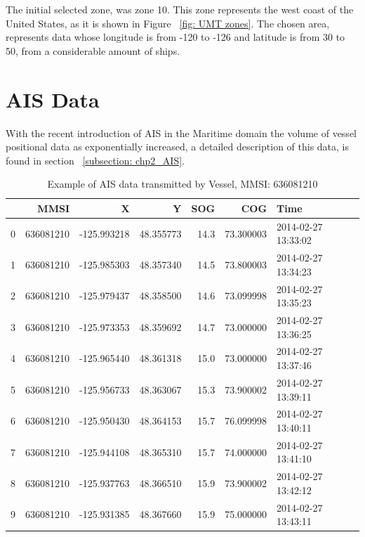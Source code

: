 The initial selected zone, was zone 10. This zone represents the west coast of the United States, as it is shown in Figure ~\ref{fig: UMT zones}.
The chosen area, represents data whose longitude is from -120 to -126 and latitude is from 30 to 50, from a considerable amount of ships.


\section{AIS Data}
\label{section: AIS Data}
 With the recent introduction of AIS in the Maritime domain the volume of vessel positional data as exponentially increased, a detailed description of this data, is found in section ~\ref{subsection: chp2_AIS}.

\begin{table}[H]
  \centering
{\small
\begin{tabular}{lrrrrrl}
\toprule
{} &       MMSI &           X &          Y &   SOG &        COG &                Time \\
\midrule
0 &  636081210 & -125.993218 &  48.355773 &  14.3 &  73.300003 & 2014-02-27 13:33:02 \\
1 &  636081210 & -125.985303 &  48.357340 &  14.5 &  73.800003 & 2014-02-27 13:34:23 \\
2 &  636081210 & -125.979437 &  48.358500 &  14.6 &  73.099998 & 2014-02-27 13:35:23 \\
3 &  636081210 & -125.973353 &  48.359692 &  14.7 &  73.000000 & 2014-02-27 13:36:25 \\
4 &  636081210 & -125.965440 &  48.361318 &  15.0 &  73.000000 & 2014-02-27 13:37:46 \\
5 &  636081210 & -125.956733 &  48.363067 &  15.3 &  73.900002 & 2014-02-27 13:39:11 \\
6 &  636081210 & -125.950430 &  48.364153 &  15.7 &  76.099998 & 2014-02-27 13:40:11 \\
7 &  636081210 & -125.944108 &  48.365310 &  15.7 &  74.000000 & 2014-02-27 13:41:10 \\
8 &  636081210 & -125.937763 &  48.366510 &  15.9 &  73.900002 & 2014-02-27 13:42:12 \\
9 &  636081210 & -125.931385 &  48.367660 &  15.9 &  75.000000 & 2014-02-27 13:43:11 \\
\bottomrule
\end{tabular} }
\caption{Example of AIS data transmitted by Vessel, MMSI: 636081210}
\label{Table: TableAIS1}
\end{table}


